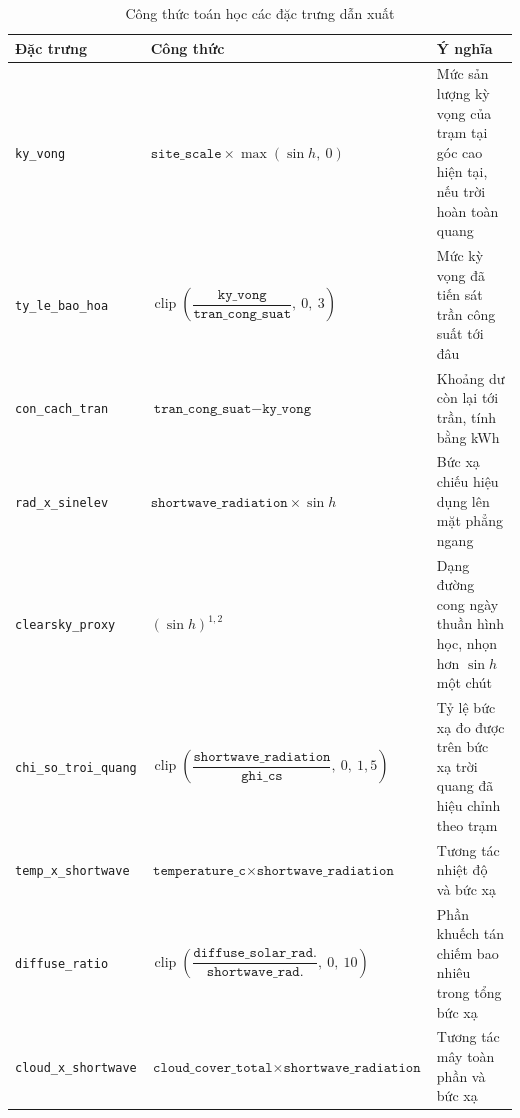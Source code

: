 \documentclass[12pt, a4paper]{report}
\begin{document}
\begin{table}[htbp]
\centering
\caption{Công thức toán học các đặc trưng dẫn xuất}
\label{tab:dinh_nghia_dan_xuat}
\small
\begin{tabular}{@{}L{4.0cm} L{7.0cm} L{4.1cm}@{}}
\toprule
\textbf{Đặc trưng} & \textbf{Công thức} & \textbf{Ý nghĩa} \\
\midrule
\texttt{ky\_vong} &
$\texttt{site\_scale} \times \max(\sin h,\ 0)$ &
Mức sản lượng kỳ vọng của trạm tại góc cao hiện tại, nếu trời hoàn toàn quang \\
\addlinespace
\texttt{ty\_le\_bao\_hoa} &
$\operatorname{clip}\!\left(\dfrac{\texttt{ky\_vong}}{\texttt{tran\_cong\_suat}},\ 0,\ 3\right)$ &
Mức kỳ vọng đã tiến sát trần công suất tới đâu \\
\addlinespace
\texttt{con\_cach\_tran} &
$\texttt{tran\_cong\_suat} - \texttt{ky\_vong}$ &
Khoảng dư còn lại tới trần, tính bằng kWh \\
\addlinespace
\texttt{rad\_x\_sinelev} &
$\texttt{shortwave\_radiation} \times \sin h$ &
Bức xạ chiếu hiệu dụng lên mặt phẳng ngang \\
\addlinespace
\texttt{clearsky\_proxy} &
$(\sin h)^{1{,}2}$ &
Dạng đường cong ngày thuần hình học, nhọn hơn $\sin h$ một chút \\
\addlinespace
\texttt{chi\_so\_troi\_quang} &
$\operatorname{clip}\!\left(\dfrac{\texttt{shortwave\_radiation}}{\texttt{ghi\_cs}},\ 0,\ 1{,}5\right)$ &
Tỷ lệ bức xạ đo được trên bức xạ trời quang đã hiệu chỉnh theo trạm \\
\addlinespace
\texttt{temp\_x\_shortwave} &
$\texttt{temperature\_c} \times \texttt{shortwave\_radiation}$ &
Tương tác nhiệt độ và bức xạ \\
\addlinespace
\texttt{diffuse\_ratio} &
$\operatorname{clip}\!\left(\dfrac{\texttt{diffuse\_solar\_rad.}}{\texttt{shortwave\_rad.}},\ 0,\ 10\right)$ &
Phần khuếch tán chiếm bao nhiêu trong tổng bức xạ \\
\addlinespace
\texttt{cloud\_x\_shortwave} &
$\texttt{cloud\_cover\_total} \times \texttt{shortwave\_radiation}$ &
Tương tác mây toàn phần và bức xạ \\
\bottomrule
\end{tabular}


\end{table}
\end{document}
